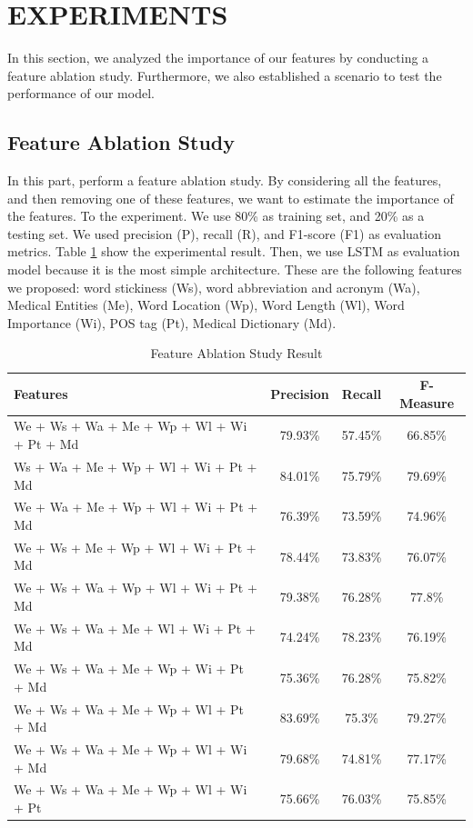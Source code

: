 \section{EXPERIMENTS}
In this section, we analyzed the importance of our features by conducting a feature ablation study. Furthermore, we also established a scenario to test the performance of our model.
\subsection{Feature Ablation Study}
In this part, perform a feature ablation study. By considering all the features, and then removing one of these features, we want to estimate the importance of the features. To the experiment. We use 80\% as training set, and 20\% as a testing set. We used precision (P), recall (R), and F1-score (F1) as evaluation metrics. Table \ref{tab:ablation} show the experimental result. Then, we use LSTM as evaluation model because it is the most simple architecture. These are the following features we proposed: word stickiness (Ws), word abbreviation and acronym (Wa), Medical Entities (Me), Word Location (Wp), Word Length (Wl), Word Importance (Wi), POS tag (Pt), Medical Dictionary (Md).

\begin{table}
	\caption{Feature Ablation Study Result}
	\label{tab:ablation}
	\begin{tabular}{lccc}
		\toprule
		Features&Precision&Recall&F-Measure\\
		\midrule
			We + Ws + Wa + Me + Wp + Wl + Wi + Pt + Md & 79.93\% & 57.45\% & 66.85\% \\
			
			Ws + Wa + Me + Wp + Wl + Wi + Pt + Md & 84.01\% & 75.79\% & 79.69\% \\
			
			We + Wa + Me + Wp + Wl + Wi + Pt + Md & 76.39\% & 73.59\% & 74.96\% \\
			
			We + Ws + Me + Wp + Wl + Wi + Pt + Md & 78.44\% & 73.83\% & 76.07\% \\
			
			We + Ws + Wa + Wp + Wl + Wi + Pt + Md & 79.38\% & 76.28\% & 77.8\% \\
			
			We + Ws + Wa + Me + Wl + Wi + Pt + Md & 74.24\% & 78.23\% & 76.19\% \\
			
			We + Ws + Wa + Me + Wp + Wi + Pt + Md & 75.36\% & 76.28\% & 75.82\% \\
			
			We + Ws + Wa + Me + Wp + Wl + Pt + Md & 83.69\% & 75.3\% & 79.27\% \\
			
			We + Ws + Wa + Me + Wp + Wl + Wi + Md & 79.68\% & 74.81\% & 77.17\% \\
			
			We + Ws + Wa + Me + Wp + Wl + Wi + Pt & 75.66\% & 76.03\% & 75.85\% \\
		\bottomrule
	\end{tabular}
\end{table}


